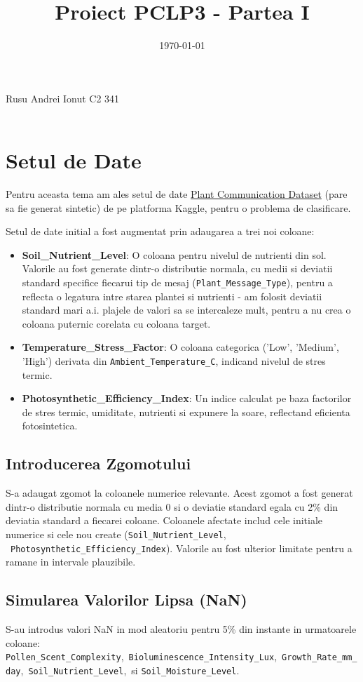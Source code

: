 \documentclass[11pt, a4paper]{article}
\title{Proiect PCLP3 - Partea I }
\date{\today}
\makeatletter
\newcommand{\studentname}{Rusu Andrei Ionut C2 341}
\renewcommand{\maketitle}{
  \begin{center}
    \Large \studentname \\
    \Huge \@title \\[1.5em]
    \large \@date
    \vspace{2em}
  \end{center}
  \par
  \thispagestyle{empty}
}
\makeatother
\begin{document}
\maketitle
\thispagestyle{empty}
\clearpage
{}

\section{Setul de Date}

Pentru aceasta tema am ales setul de date \href{https://www.kaggle.com/datasets/efeyldz/plant-communication-dataset-classification?resource=download}{Plant Communication Dataset} (pare sa fie generat sintetic) de pe platforma Kaggle, pentru o problema de clasificare.

Setul de date initial a fost augmentat prin adaugarea a trei noi coloane:
\sloppy
\begin{itemize}
    \item  \textbf{Soil\_Nutrient\_Level}: O coloana pentru nivelul de nutrienti din sol. Valorile au fost generate dintr-o distributie normala, cu medii si deviatii standard specifice fiecarui tip de mesaj (\texttt{Plant\_Message\_Type}), pentru a reflecta o legatura intre starea plantei si nutrienti - am folosit deviatii standard mari a.i. plajele de valori sa se intercaleze mult, pentru a nu crea o coloana puternic corelata cu coloana target.
    \item \textbf{Temperature\_Stress\_Factor}: O coloana categorica ('Low', 'Medium', 'High') derivata din \texttt{Ambient\_Temperature\_C}, indicand nivelul de stres termic.
    \item \textbf{Photosynthetic\_Efficiency\_Index}: Un indice calculat pe baza factorilor de stres termic, umiditate, nutrienti si expunere la soare, reflectand eficienta fotosintetica.
\end{itemize}

\subsection{Introducerea Zgomotului}
S-a adaugat zgomot la coloanele numerice relevante. Acest zgomot a fost generat dintr-o distributie normala cu media 0 si o deviatie standard egala cu 2\% din deviatia standard a fiecarei coloane. Coloanele afectate includ cele initiale numerice si cele nou create (\texttt{Soil\_Nutrient\_Level}, \  \texttt{Photosynthetic\_Efficiency\_Index}). Valorile au fost ulterior limitate pentru a ramane in intervale plauzibile.

\subsection{Simularea Valorilor Lipsa (NaN)}
\sloppy
S-au introdus valori NaN in mod aleatoriu pentru 5\% din instante in urmatoarele coloane: \texttt{Pollen\_Scent\_Complexity},\ \texttt{Bioluminescence\_Intensity\_Lux},\ \texttt{Growth\_Rate\_mm\_day},\ \texttt{Soil\_Nutrient\_Level},\ si \texttt{Soil\_Moisture\_Level}.
\end{document}
